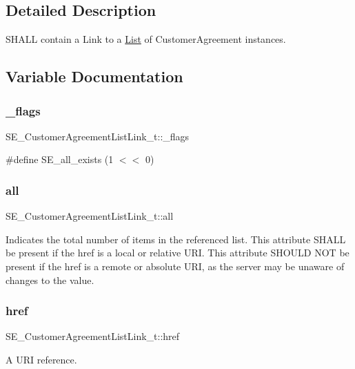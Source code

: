 \subsection{Detailed Description}
S\+H\+A\+LL contain a Link to a \hyperlink{structList}{List} of Customer\+Agreement instances. 

\subsection{Variable Documentation}
\mbox{\label{group__CustomerAgreementListLink_ga617af80e74d41067f1798ec6ff0996d0}} 
\subsubsection{\texorpdfstring{\+\_\+flags}{\_flags}}
{\footnotesize\ttfamily S\+E\+\_\+\+Customer\+Agreement\+List\+Link\+\_\+t\+::\+\_\+flags}

\#define S\+E\+\_\+all\+\_\+exists (1 $<$$<$ 0) \mbox{\label{group__CustomerAgreementListLink_gad78e3e9fc208189a5e63162847120fc7}} 
\subsubsection{\texorpdfstring{all}{all}}
{\footnotesize\ttfamily S\+E\+\_\+\+Customer\+Agreement\+List\+Link\+\_\+t\+::all}

Indicates the total number of items in the referenced list. This attribute S\+H\+A\+LL be present if the href is a local or relative U\+RI. This attribute S\+H\+O\+U\+LD N\+OT be present if the href is a remote or absolute U\+RI, as the server may be unaware of changes to the value. \mbox{\label{group__CustomerAgreementListLink_gacc3612285c41b988cc39cd0bb29e7300}} 
\subsubsection{\texorpdfstring{href}{href}}
{\footnotesize\ttfamily S\+E\+\_\+\+Customer\+Agreement\+List\+Link\+\_\+t\+::href}

A U\+RI reference. 